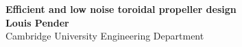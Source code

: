 \documentclass[a2,portrait]{a0poster}
\begin{document}

\begin{center}
\begin{minipage}{0.75\textwidth}
\centering
\Huge \color{NavyBlue} \textbf{Efficient and low noise toroidal propeller design} \color{Black}\\ %
\huge \textbf{Louis Pender}\\[0.5cm] %
\huge Cambridge University Engineering Department\\ %
\end{minipage}
\end{center}

\end{document}
